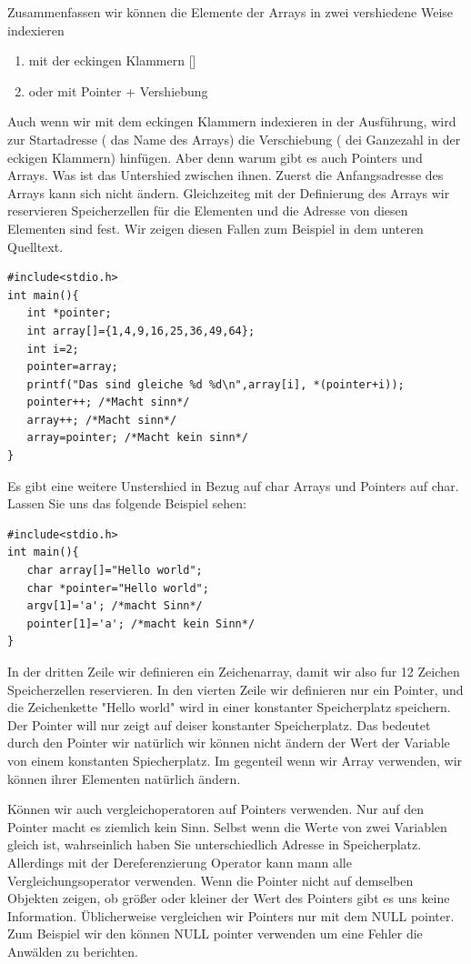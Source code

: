 Zusammenfassen wir können die Elemente der Arrays in zwei vershiedene Weise indexieren
\begin{enumerate}
\item mit der eckingen Klammern []
\item oder mit Pointer  + Vershiebung
\end{enumerate}
Auch wenn wir mit dem eckingen Klammern indexieren in der Ausführung, wird zur Startadresse
( das Name des Arrays) die Verschiebung ( dei Ganzezahl in der eckigen Klammern) hinfügen. Aber
denn warum gibt es auch Pointers und Arrays. Was ist das Untershied zwischen ihnen. Zuerst
die Anfangsadresse des Arrays kann sich nicht ändern. Gleichzeiteg mit der Definierung des
Arrays wir reservieren Speicherzellen für die Elementen und die Adresse von diesen Elementen sind
fest. Wir zeigen diesen Fallen zum Beispiel in dem unteren Quelltext.
\begin{lstlisting}
#include<stdio.h>
int main(){
   int *pointer;
   int array[]={1,4,9,16,25,36,49,64};
   int i=2;
   pointer=array;
   printf("Das sind gleiche %d %d\n",array[i], *(pointer+i));
   pointer++; /*Macht sinn*/
   array++; /*Macht sinn*/
   array=pointer; /*Macht kein sinn*/
}
\end{lstlisting} 
Es gibt eine weitere Unstershied in Bezug auf char Arrays und Pointers auf char. Lassen
Sie uns das folgende Beispiel sehen:
\begin{lstlisting}
#include<stdio.h>
int main(){
   char array[]="Hello world";
   char *pointer="Hello world";
   argv[1]='a'; /*macht Sinn*/
   pointer[1]='a'; /*macht kein Sinn*/
}
\end{lstlisting}
In der dritten Zeile wir definieren ein Zeichenarray, damit wir also fur 12 Zeichen Speicherzellen reservieren. 
In den vierten Zeile wir definieren nur ein Pointer, und die Zeichenkette "Hello world" wird in einer konstanter
Speicherplatz speichern. Der Pointer will nur zeigt auf deiser konstanter Speicherplatz. Das bedeutet durch den
Pointer wir natürlich wir können nicht ändern der Wert der Variable von einem konstanten Spiecherplatz. Im gegenteil
wenn wir Array verwenden, wir können ihrer Elementen natürlich ändern.

Können wir auch vergleichoperatoren auf Pointers verwenden. Nur auf den Pointer macht es ziemlich kein Sinn.
Selbst wenn die Werte von zwei Variablen gleich ist, wahrseinlich haben Sie unterschiedlich Adresse in Speicherplatz.
Allerdings mit der Dereferenzierung Operator kann mann alle Vergleichungsoperator verwenden. Wenn die Pointer nicht
auf demselben Objekten zeigen, ob größer oder kleiner der Wert des Pointers gibt es uns keine Information. 
Üblicherweise vergleichen wir Pointers nur mit dem NULL pointer. Zum Beispiel wir den können NULL pointer 
verwenden um eine Fehler die Anwälden zu berichten.

